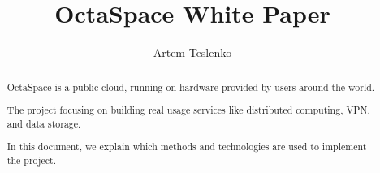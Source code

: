 \documentclass[a4paper]{article}
\begin{document}
\title{OctaSpace White Paper}

\author{Artem Teslenko}

\maketitle

\tableofcontents

\begin{abstract}
OctaSpace is a public cloud, running on hardware provided by users around the world.

The project focusing on building real usage services like distributed computing, VPN, and data storage.

In this document, we explain which methods and technologies are used to implement the project.

\end{abstract}


\newpage

\newpage

\newpage




\end{document}
